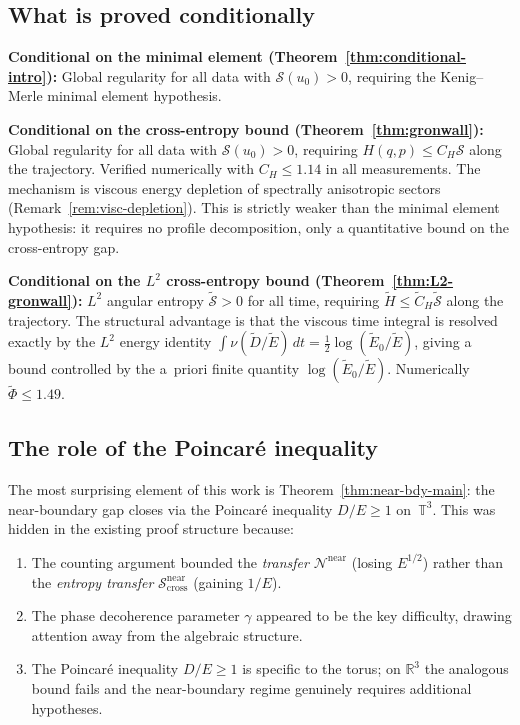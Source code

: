 \documentclass[11pt]{article}
\theoremstyle{definition}
\newcommand{\R}{\mathbb{R}}
\newcommand{\T}{\mathbb{T}}
\newcommand{\cS}{\mathcal{S}}
\newcommand{\cN}{\mathcal{N}}
\begin{document}
\subsection{What is proved conditionally}

\textbf{Conditional on the minimal element
(Theorem~\ref{thm:conditional-intro}):}
Global regularity for all data with $\cS(u_0) > 0$,
requiring the Kenig--Merle minimal element hypothesis.

\textbf{Conditional on the cross-entropy bound
(Theorem~\ref{thm:gronwall}):}
Global regularity for all data with $\cS(u_0) > 0$,
requiring $H(q,p) \leq C_H\cS$ along the trajectory.
Verified numerically with $C_H \leq 1.14$ in all
measurements.  The mechanism is viscous energy depletion
of spectrally anisotropic sectors
(Remark~\ref{rem:visc-depletion}).
This is strictly weaker than the minimal element
hypothesis: it requires no profile decomposition,
only a quantitative bound on the cross-entropy gap.

\textbf{Conditional on the $L^2$ cross-entropy bound
(Theorem~\ref{thm:L2-gronwall}):}
$L^2$ angular entropy $\widetilde{\cS} > 0$ for all time,
requiring $\widetilde{H} \leq \widetilde{C}_H
\widetilde{\cS}$ along the trajectory.
The structural advantage is that the viscous time integral
is resolved exactly by the $L^2$ energy identity
$\int\nu(\widetilde{D}/\widetilde{E})\,dt
= \frac{1}{2}\log(\widetilde{E}_0/\widetilde{E})$,
giving a bound controlled by the a~priori finite quantity
$\log(\widetilde{E}_0/\widetilde{E})$.
Numerically $\widetilde{\Phi} \leq 1.49$.


\subsection{The role of the Poincar\'e inequality}

The most surprising element of this work is
Theorem~\ref{thm:near-bdy-main}: the near-boundary gap
closes via the Poincar\'e inequality $D/E \geq 1$ on~$\T^3$.
This was hidden in the existing proof structure because:
\begin{enumerate}[label=(\alph*)]
\item The counting argument bounded the \emph{transfer}
$\cN^{\mathrm{near}}$ (losing $E^{1/2}$) rather than
the \emph{entropy transfer} $\cS_{\mathrm{cross}}^{\mathrm{near}}$
(gaining $1/E$).
\item The phase decoherence parameter $\gamma$ appeared to
be the key difficulty, drawing attention away from the
algebraic structure.
\item The Poincar\'e inequality $D/E \geq 1$ is specific
to the torus; on $\R^3$ the analogous bound fails and
the near-boundary regime genuinely requires additional
hypotheses.
\end{enumerate}
\end{document}
